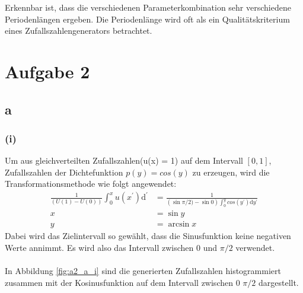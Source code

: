 Erkennbar ist, dass die verschiedenen Parameterkombination sehr verschiedene Periodenlängen ergeben. Die Periodenlänge wird oft als ein Qualitätskriterium eines Zufallszahlengenerators betrachtet.




\section*{Aufgabe 2}

\subsection*{a}
\subsubsection*{(i)}
Um aus gleichverteilten Zufallszahlen(u(x) = 1) auf dem Intervall $[0,1]$, Zufallszahlen
der Dichtefunktion $p(y) = cos(y)$ zu erzeugen, wird die Transformationsmethode
wie folgt angewendet:
\begin{align*}
  \frac{1}{\left(U(1) - U(0)\right)} \int_{0}^{x} u(x^\prime) \mathrm{d}^\prime &= \frac{1}{\left( \sin \pi /2) - \sin 0 \right) \int_{0}^{y} cos(y^\prime) \mathrm{d}y^\prime}\\
  x &= \sin y \\
  y &= \arcsin x
\end{align*}
Dabei wird das Zielintervall so gewählt, dass die Sinusfunktion keine negativen Werte annimmt. Es wird also das Intervall
zwischen $0$ und $\pi / 2$ verwendet.\\ \\
In Abbildung \ref{fig:a2_a_i} sind die generierten Zufallszahlen histogrammiert zusammen mit der Kosinusfunktion auf dem Intervall zwischen $0$ $\pi / 2$ dargestellt.

